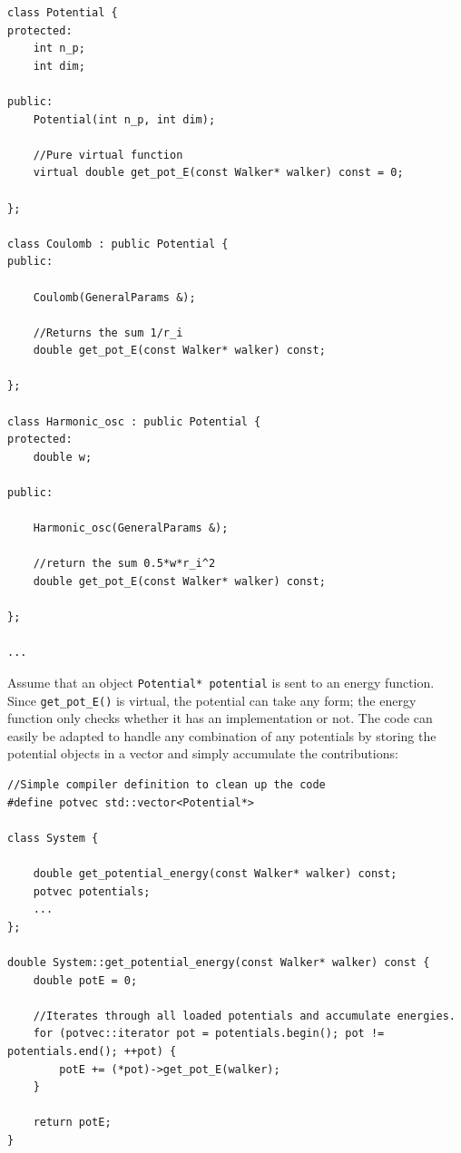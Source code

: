 \clearpage
\vspace{0.5 cm}
\begin{lstlisting}[caption={An example from the QMC code. The superclass of potentials is defined by a number of particles (line 3), a dimension (line 4) and a pure virtual function for extracting the local energy of a given walker (line 10). Specific potentials are implemented as subclasses (line 14 and 24), simply overriding the pure virtual function with their own implementations.}]
class Potential {
protected:
    int n_p;
    int dim;

public:
    Potential(int n_p, int dim);

    //Pure virtual function
    virtual double get_pot_E(const Walker* walker) const = 0;

};

class Coulomb : public Potential {
public:

    Coulomb(GeneralParams &);

    //Returns the sum 1/r_i
    double get_pot_E(const Walker* walker) const;

};

class Harmonic_osc : public Potential {
protected:
    double w;

public:

    Harmonic_osc(GeneralParams &);

    //return the sum 0.5*w*r_i^2
    double get_pot_E(const Walker* walker) const;

};

...

\end{lstlisting}

Assume that an object \verb+Potential* potential+ is sent to an energy function. Since \verb+get_pot_E()+ is virtual, the potential can take any form; the energy function only checks whether it has an implementation or not. The code can easily be adapted to handle any combination of any potentials by storing the potential objects in a vector and simply accumulate the contributions:

\vspace{0.5cm}
\begin{lstlisting}
//Simple compiler definition to clean up the code
#define potvec std::vector<Potential*>

class System {

    double get_potential_energy(const Walker* walker) const;
    potvec potentials;
    ...
};

double System::get_potential_energy(const Walker* walker) const {
    double potE = 0;

    //Iterates through all loaded potentials and accumulate energies.
    for (potvec::iterator pot = potentials.begin(); pot != potentials.end(); ++pot) {
        potE += (*pot)->get_pot_E(walker);
    }

    return potE;
}
\end{lstlisting}

